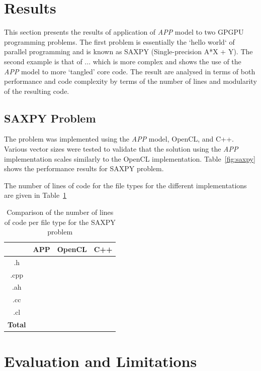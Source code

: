 \documentclass{sig-alternate-05-2015}
\begin{document}
\section{Results}\label{sec:results}

This section presents the results of application of \textit{APP} model to two
GPGPU programming problems. The first problem is essentially the `hello world`
of parallel programming and is known as SAXPY (Single-precision A*X + Y). The
second example is that of ... which is more complex and shows the use of the
\textit{APP} model to more `tangled' core code. The result are analysed in terms
of both performance and code complexity by terms of the number of lines and
modularity of the resulting code.

\subsection{SAXPY Problem}

The problem was implemented using the \textit{APP} model, OpenCL, and C++.
Various vector sizes were tested to validate that the solution using the
\textit{APP} implementation scales similarly to the OpenCL implementation.
Table~\ref{fig:saxpy} shows the performance results for SAXPY problem.

The number of lines of code for the file types for the different implementations
are given in Table~\ref{tab:saxpy}

\begin{table}[!b]
\centering
\caption{Comparison of the number of lines of code per file type for the SAXPY
problem }
\label{tab:saxpy}
\begin{tabular}{|c|c|c|c|} 
	\hline
				& APP	& OpenCL	& C++	\\ \hline
.h				&		&			&		\\ \hline
.cpp			&		&			&		\\ \hline
.ah				&		&			&		\\ \hline
.cc				&		&			&		\\ \hline
.cl				&		&			&		\\ \hline
\textbf{Total}	&		&			&		\\ \hline		
	\hline
\end{tabular}
\end{table}

\section{Evaluation and Limitations}\label{sec:evaluation}
\end{document}
